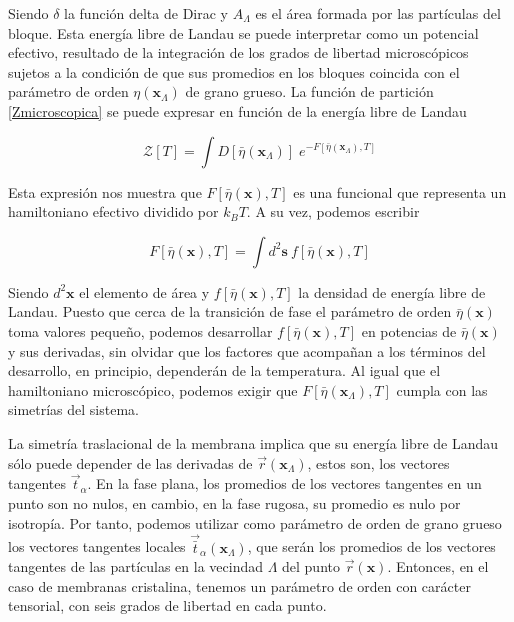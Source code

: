 Siendo $\delta$ la función delta de Dirac y $A_{\Lambda}$ es el área
formada por las partículas del bloque. Esta energía libre de Landau se puede
interpretar como un potencial efectivo, resultado de la integración de los
grados de libertad microscópicos sujetos a la condición de que sus promedios
en los  bloques coincida con el parámetro de orden
$\eta(\mathbf{x}_{\Lambda})$ de grano grueso. La función de partición
\eqref{Zmicroscopica} se puede expresar en función de la energía libre de
Landau

\begin{equation*}
\mathcal{Z}[T]=\int D[\bar{\eta}(\mathbf{x}_{\Lambda})]\; e^{-F[\bar{\eta}(\mathbf{x}_{\Lambda}),T]}
\end{equation*}

Esta expresión nos muestra que $F[\bar{\eta}(\mathbf{x}),T]$ es una funcional
que representa un hamiltoniano efectivo dividido por $k_BT$. A su vez, podemos
escribir 

\begin{equation*}
F[\bar{\eta}(\mathbf{x}),T]=\int\! d^2\mathbf{s}\ f[\bar{\eta}(\mathbf{x}),T]
\end{equation*}

Siendo $d^2\mathbf{x}$ el elemento de área y $f[\bar{\eta}(\mathbf{x}),T]$ la
densidad de energía libre de Landau. Puesto que cerca de la transición de fase
el parámetro de orden $\bar{\eta}(\mathbf{x})$ toma valores pequeño, podemos
desarrollar $f[\bar{\eta}(\mathbf{x}),T]$ en potencias de
$\bar{\eta}(\mathbf{x})$ y sus derivadas, sin olvidar que los factores que
acompañan a los términos del desarrollo, en principio, dependerán de la
temperatura. Al igual que el hamiltoniano microscópico, podemos exigir que
$F[\bar{\eta}(\mathbf{x}_{\Lambda}),T]$ cumpla con las simetrías del sistema.

La simetría traslacional de la membrana implica que su energía libre de Landau
sólo puede depender de las derivadas de $\vec{r}(\mathbf{x}_{\Lambda})$, estos
son, los vectores tangentes $\vec{t}_{\alpha}$. En la fase
plana, los promedios de los vectores tangentes en un punto son no nulos, en
cambio, en la fase rugosa, su promedio es nulo por isotropía. Por tanto,
podemos utilizar como  parámetro de orden de grano grueso los vectores
tangentes locales $\vec{\bar{t}}_{\alpha}(\mathbf{x}_{\Lambda})$, que serán
los promedios de los vectores tangentes de las partículas en la vecindad
$\Lambda$ del punto $\vec{r}(\mathbf{x})$. Entonces, en el caso de
membranas cristalina, tenemos un parámetro de orden con carácter tensorial,
con seis grados de libertad en cada punto.

